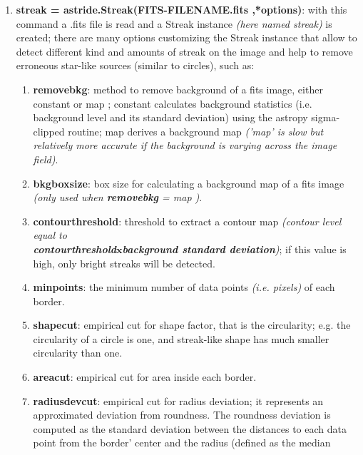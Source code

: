 \documentclass[11pt]{article}
\begin{document}
\begin{enumerate}
    \item \textbf{streak = astride.Streak(\textquotesingle FITS-FILENAME.fits \textquotesingle,*options)}: with this
command a .fits file is read and a Streak instance \textit{(here named streak)} is
created; there are many options customizing the Streak instance that allow
to detect different kind and amounts of streak on the image and help to
remove erroneous star-like sources (similar to circles), such as:
\begin{enumerate}
    \item \textbf{remove\textunderscore bkg}: method to remove background of a fits image, either \textquotesingle constant \textquotesingle or \textquotesingle map \textquotesingle; \textquotesingle constant \textquotesingle calculates background statistics (i.e. background
level and its standard deviation) using the astropy sigma-clipped
routine; \textquotesingle map \textquotesingle derives a background map \textit{(’map’ is slow but relatively
more accurate if the background is varying across the image field)}.
\item  \textbf{bkg\textunderscore box\textunderscore  size}: box size for calculating a background map of a fits image
\textit{(only used when \textbf{remove\textunderscore bkg} = \textquotesingle map \textquotesingle)}.
\item \textbf{contour\textunderscore threshold}: threshold to extract a contour map \textit{(contour level equal to\\ \textbf{contour\textunderscore  threshold$\mathbf{x}$background standard deviation})}; if this
value is high, only bright streaks will be detected.
\item  \textbf{min\textunderscore points}: the minimum number of data points \textit{(i.e. pixels) } of each
border.
\item \textbf{shape\textunderscore  cut}: empirical cut for shape factor, that is the circularity; e.g.
the circularity of a circle is one, and streak-like shape has much smaller
circularity than one.
\item \textbf{area\textunderscore cut}: empirical cut for area inside each border.
\item \textbf{radius\textunderscore dev\textunderscore cut}: empirical cut for radius deviation; it represents an
approximated deviation from roundness. The roundness deviation is
computed as the standard deviation between the distances to each data
point from the border’ center and the radius (defined as the median

\end{enumerate}
\end{enumerate}
\end{document}
